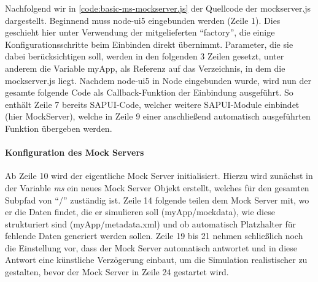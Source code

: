 Nachfolgend wir in \autoref{code:basic-ms-mockserver.js} der Quellcode der mockserver.js dargestellt.
Beginnend muss node-ui5 eingebunden werden (Zeile 1).
Dies geschieht hier unter Verwendung der mitgelieferten \enquote{factory}, die einige Konfigurationsschritte beim Einbinden direkt übernimmt.
Parameter, die sie dabei berücksichtigen soll, werden in den folgenden 3 Zeilen gesetzt, unter anderem die Variable myApp, als Referenz auf das Verzeichnis, in dem die mockserver.js liegt.
Nachdem node-ui5 in Node eingebunden wurde, wird nun der gesamte folgende Code als Callback-Funktion der Einbindung ausgeführt.
So enthält Zeile 7 bereits SAPUI-Code, welcher weitere SAPUI-Module einbindet (hier MockServer), welche in Zeile 9 einer anschließend automatisch ausgeführten Funktion übergeben werden.

\paragraph{Konfiguration des Mock Servers}
Ab Zeile 10 wird der eigentliche Mock Server initialisiert.
Hierzu wird zunächst in der Variable \emph{ms} ein neues Mock Server Objekt erstellt, welches für den gesamten Subpfad von \enquote{/} zuständig ist.
Zeile 14 folgende teilen dem Mock Server mit, wo er die Daten findet, die er simulieren soll (myApp/mockdata), wie diese strukturiert sind (myApp/metadata.xml) und ob automatisch Platzhalter für fehlende Daten generiert werden sollen.
Zeile 19 bis 21 nehmen schließlich noch die Einstellung vor, dass der Mock Server automatisch antwortet und in diese Antwort eine künstliche Verzögerung einbaut, um die Simulation realistischer zu gestalten, bevor der Mock Server in Zeile 24 gestartet wird.


